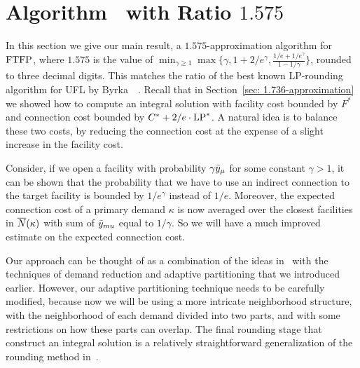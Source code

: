 

\section{Algorithm~{\EBGS} with Ratio $1.575$}\label{sec: 1.575-approximation}

In this section we give our main result, a $1.575$-approximation
algorithm for $\mbox{\rm FTFP}$, where $1.575$ is the value of $\min_{\gamma\geq
  1}\max\{\gamma, 1+2/e^\gamma, \frac{1/e+1/e^\gamma}{1-1/\gamma}\}$,
rounded to three decimal digits. This matches the ratio of the best
known LP-rounding algorithm for UFL by
Byrka~{\etal}~\cite{ByrkaGS10}. Recall that in Section~\ref{sec:
  1.736-approximation} we showed how to compute an integral solution
with facility cost bounded by $F^\ast$ and connection cost bounded by
$C^\ast + 2/e\cdot\mbox{\rm LP}^\ast$. A natural idea is to balance these two
costs, by reducing the connection cost at the expense of a slight
increase in the facility cost.

Consider, if we open a facility with probability $\gamma{\bar y}_{\mu}$
for some constant $\gamma > 1$, it can be shown that the probability
that we have to use an indirect connection to the target facility is
bounded by $1/e^\gamma$ instead of $1/e$. Moreover, the expected
connection cost of a primary demand $\kappa$ is now averaged over the
closest facilities in ${\overline{N}}(\kappa)$ with sum of ${\bar y}_{mu}$ equal
to $1/\gamma$. So we will have a much improved estimate on the
expected connection cost.

Our approach can be thought of as a combination of the ideas
in~\cite{ByrkaGS10} with the techniques of demand reduction and
adaptive partitioning that we introduced earlier. However, our
adaptive partitioning technique needs to be carefully modified, because
now we will be using a more intricate neighborhood structure, with the
neighborhood of each demand divided into two parts, and with some
restrictions on how these parts can overlap. The final rounding
stage that construct an integral solution is a relatively
straightforward generalization of the rounding method in~\cite{ByrkaGS10}.

